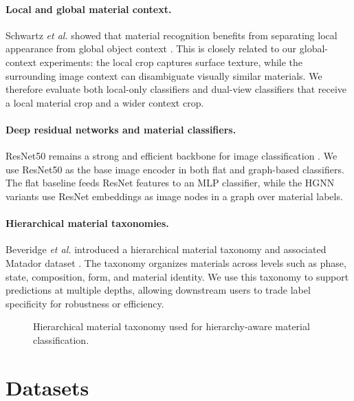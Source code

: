 \documentclass[11pt,twocolumn,letterpaper]{article}
\begin{document}
\paragraph{Local and global material context.}
Schwartz \textit{et al.} showed that material recognition benefits from separating local appearance from global object context \cite{schwartz2016}. This is closely related to our global-context experiments: the local crop captures surface texture, while the surrounding image context can disambiguate visually similar materials. We therefore evaluate both local-only classifiers and dual-view classifiers that receive a local material crop and a wider context crop.

\paragraph{Deep residual networks and material classifiers.}
ResNet50 remains a strong and efficient backbone for image classification \cite{he2016resnet}. We use ResNet50 as the base image encoder in both flat and graph-based classifiers. The flat baseline feeds ResNet features to an MLP classifier, while the HGNN variants use ResNet embeddings as image nodes in a graph over material labels.

\paragraph{Hierarchical material taxonomies.}
Beveridge \textit{et al.} introduced a hierarchical material taxonomy and associated Matador dataset \cite{beveridge2025}. The taxonomy organizes materials across levels such as phase, state, composition, form, and material identity. We use this taxonomy to support predictions at multiple depths, allowing downstream users to trade label specificity for robustness or efficiency.

\begin{figure}[t]
    \centering
    \caption{Hierarchical material taxonomy used for hierarchy-aware material classification.}
    \label{fig:taxonomy}
\end{figure}

\section{Datasets}
\end{document}
